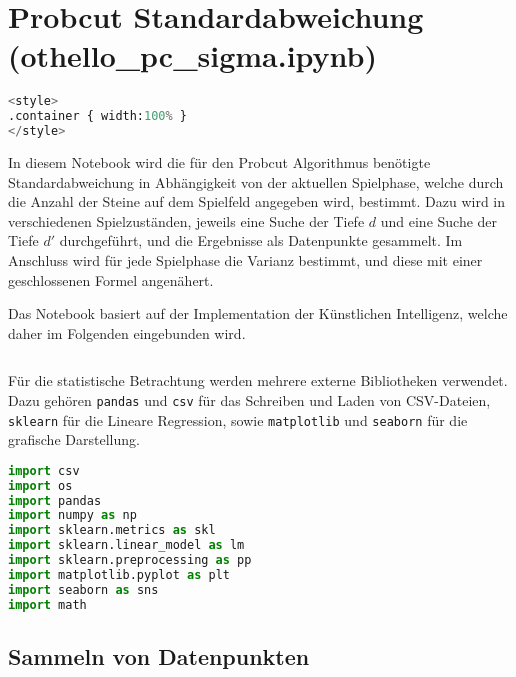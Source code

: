 \hypertarget{probcut-standardabweichung-othello_pc_sigma.ipynb}{%
\section{Probcut Standardabweichung
(othello\_pc\_sigma.ipynb)}\label{probcut-standardabweichung-othello_pc_sigma.ipynb}}

\label{sec:pcsigma}

\begin{lstlisting}[language=Python]
%%HTML
<style>
.container { width:100% }
</style>
\end{lstlisting}

In diesem Notebook wird die für den Probcut Algorithmus benötigte
Standardabweichung in Abhängigkeit von der aktuellen Spielphase, welche
durch die Anzahl der Steine auf dem Spielfeld angegeben wird, bestimmt.
Dazu wird in verschiedenen Spielzuständen, jeweils eine Suche der Tiefe
\(d\) und eine Suche der Tiefe \(d'\) durchgeführt, und die Ergebnisse
als Datenpunkte gesammelt. Im Anschluss wird für jede Spielphase die
Varianz bestimmt, und diese mit einer geschlossenen Formel angenähert.

Das Notebook basiert auf der Implementation der Künstlichen Intelligenz,
welche daher im Folgenden eingebunden wird.

\begin{lstlisting}[language=Python]
%run othello_ai.ipynb
\end{lstlisting}

Für die statistische Betrachtung werden mehrere externe Bibliotheken
verwendet. Dazu gehören \passthrough{\lstinline!pandas!} und
\passthrough{\lstinline!csv!} für das Schreiben und Laden von
CSV-Dateien, \passthrough{\lstinline!sklearn!} für die Lineare
Regression, sowie \passthrough{\lstinline!matplotlib!} und
\passthrough{\lstinline!seaborn!} für die grafische Darstellung.

\begin{lstlisting}[language=Python]
import csv
import os
import pandas
import numpy as np
import sklearn.metrics as skl
import sklearn.linear_model as lm
import sklearn.preprocessing as pp
import matplotlib.pyplot as plt
import seaborn as sns
import math
\end{lstlisting}

\hypertarget{sammeln-von-datenpunkten}{%
\subsection{Sammeln von Datenpunkten}\label{sammeln-von-datenpunkten}}

